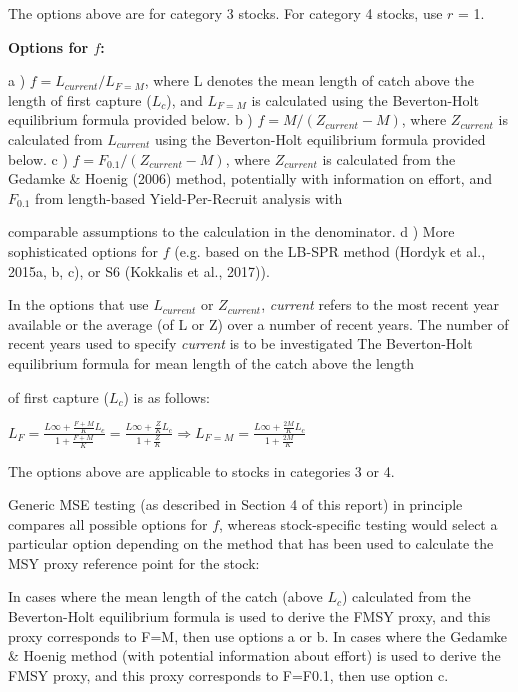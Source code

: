 \documentclass[11pt]{article}
\begin{document}
The options above are for category 3 stocks. For category 4 stocks, use $r$ = 1. 



\textbf{Options for $f$:} 

a ) $f = L_{current}/L_{F=M}$, where L denotes the mean length of catch above the length of first capture ($L_c$), and $L_{F=M}$ is calculated using the Beverton-Holt equilibrium formula provided below.
b ) $f = M/(Z_{current}-M)$, 
where $Z_{current}$ is calculated from $L_{current}$ using the Beverton-Holt equilibrium formula provided below.
c ) $f = F_{0.1}/(Z_{current}-M)$, where $Z_{current}$ is calculated from the Gedamke \& Hoenig (2006) method, potentially with information on effort, and $F_{0.1}$ from length-based Yield-Per-Recruit analysis with 

comparable assumptions to the calculation in the denominator.  
d )  More sophisticated options for $f$ (e.g. based on the LB-SPR method (Hordyk et al., 2015a, b, c), or S6 (Kokkalis et al., 2017)). 

In the options that use $L_{current}$ or $Z_{current}$, \textit{current} refers to the most recent year available or the average (of L or Z) over a number of recent years. The number of recent years used to specify \textit{current} is to be investigated The Beverton-Holt equilibrium formula for mean length of the catch above the length 

of first capture ($L_c$) is as follows: 

$L_{F} = \frac{L\infty +\frac{F+M}{K}L_c}{1+\frac{F+M}{K}} =
         \frac{L\infty +\frac{Z}{K}L_c}{1+\frac{Z}{K}} \Rightarrow L_{F=M} = \frac{L\infty +\frac{2M}{K}L_c}{1+\frac{2M}{K}}$

The options above are applicable to stocks in categories 3 or 4. 

Generic MSE testing (as described in Section 4 of this report) in principle compares all possible options for $f$, whereas stock-specific testing would select a particular option depending on the method that has  been used to calculate the MSY proxy reference point for the stock: 


In  cases  where  the  mean  length  of  the  catch  (above  $L_c$)  calculated  from the Beverton-Holt equilibrium formula is used to derive the FMSY proxy, and this proxy corresponds to F=M, then use options a or b.  In  cases  where  the  Gedamke  \&  Hoenig  method  (with  potential  information about effort) is used to derive the FMSY proxy, and this proxy corresponds to F=F0.1, then use option c. 
\end{document}
